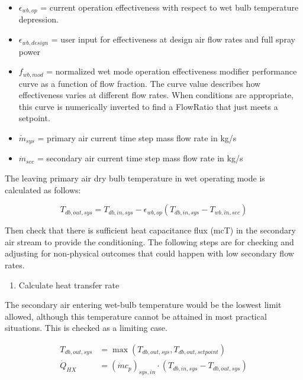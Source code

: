 \begin{itemize}
\item
  \(\epsilon_{wb,op}\) = current operation effectiveness with respect to wet bulb temperature depression.
\item
  \(\epsilon_{wb,design}\) = user input for effectiveness at design air flow rates and full spray power
\item
  \(f_{wb,mod}\) = normalized wet mode operation effectiveness modifier performance curve as a function of flow fraction. The curve value describes how effectiveness varies at different flow rates. When conditions are appropriate, this curve is numerically inverted to find a FlowRatio that just meets a setpoint.
\item
  \(\dot{m}_{sys}\) = primary air current time step mass flow rate in kg/s
\item
  \(\dot{m}_{sec}\) = secondary air current time step mass flow rate in kg/s
\end{itemize}

The leaving primary air dry bulb temperature in wet operating mode is calculated as follows:

\begin{equation}
T_{db,out,sys} = T_{db,in,sys} - \epsilon_{wb,op} \left( T_{db,in,sys} - T_{wb,in,sec} \right)
\end{equation}

Then check that there is sufficient heat capacitance flux (mcT) in the secondary air stream to provide the conditioning. The following steps are for checking and adjusting for non-physical outcomes that could happen with low secondary flow rates.

\begin{enumerate}
\def\labelenumi{\arabic{enumi}.}
\tightlist
\item
  Calculate heat transfer rate
\end{enumerate}

The secondary air entering wet-bulb temperature would be the loswest limit allowed, although this temperature cannot be attained in most practical situations. This is checked as a limiting case.

\begin{equation}
  \begin{array}{rl}
    T_{db,out,sys} & = \max\left(T_{db,out,sys},T_{db,out,setpoint}\right) \\
    \dot{Q}_{HX} & = \left(\dot{m}c_p\right)_{sys,in} \cdot \left(T_{db,in,sys}-T_{db,out,sys}\right)
  \end{array}
\end{equation}

